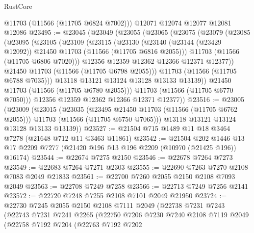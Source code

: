 \begin{lexlean}{RustCore}
\begin{coremodule}
      @11703
      (@11566 (@11705 @6824 @7002)))
    @12071
    @12074
    @12077
    @12081
    @12086
@23495 := @23045
    (@23049
      (@23055
        (@23065
          (@23075
            (@23079
              (@23085
                (@23095
                  (@23105
                    (@23109
                      (@23115
                        (@23130
                          (@23140
                            (@23144 (@23429 @12092))
                            @21450
                            @11703
                            (@11566 (@11705 @6816 @2055)))
                          @11703
                          (@11566 (@11705 @6806 @7020)))
                        @12356
                        @12359
                        @12362
                        @12366
                        @12371
                        @12377))
                    @21450
                    @11703
                    (@11566 (@11705 @6798 @2055)))
                  @11703
                  (@11566 (@11705 @6788 @7035)))
                @13118
                @13121
                @13124
                @13128
                @13133
                @13139))
            @21450
            @11703
            (@11566 (@11705 @6780 @2055)))
          @11703
          (@11566 (@11705 @6770 @7050)))
        @12356
        @12359
        @12362
        @12366
        @12371
        @12377))
@23516 := @23005
    (@23009
      (@23015
        (@23035
          (@23495 @21450 @11703 (@11566 (@11705 @6762 @2055)))
          @11703
          (@11566 (@11705 @6750 @7065)))
        @13118
        @13121
        @13124
        @13128
        @13133
        @13139))
@23527 := @21504 @715 @1489 @11 @18 @3464 @7278 (@21648 @712 @11 @3463 @11861)
@23542 := @21504
    @202
    @1446
    @13
    @17
    @2209
    @7277
    (@21420 @196 @13 @196 @2209 (@10970 (@21425 @196)) @16174)
@23544 := @22674 @7275 @2150
@23546 := @22678 @7264 @7273
@23549 := @22683 @7264 @7271 @2303
@23555 := @22690 @7263 @7270 @2108 @7083 @2049 @21833
@23561 := @22700 @7260 @2055 @2150 @2108 @7093 @2049
@23563 := @22708 @7249 @7258
@23566 := @22713 @7249 @7256 @2141
@23572 := @22720 @7248 @7255 @2108 @7101 @2049 @21950
@23724 := @22730
    @7245
    @2055
    @2150
    @2108
    @7111
    @2049
    (@22738
      @7231
      @7243
      (@22743
        @7231
        @7241
        @2265
        (@22750
          @7206
          @7230
          @7240
          @2108
          @7119
          @2049
          (@22758
            @7192
            @7204
            (@22763
              @7192
              @7202

\end{coremodule}
\end{lexlean}
